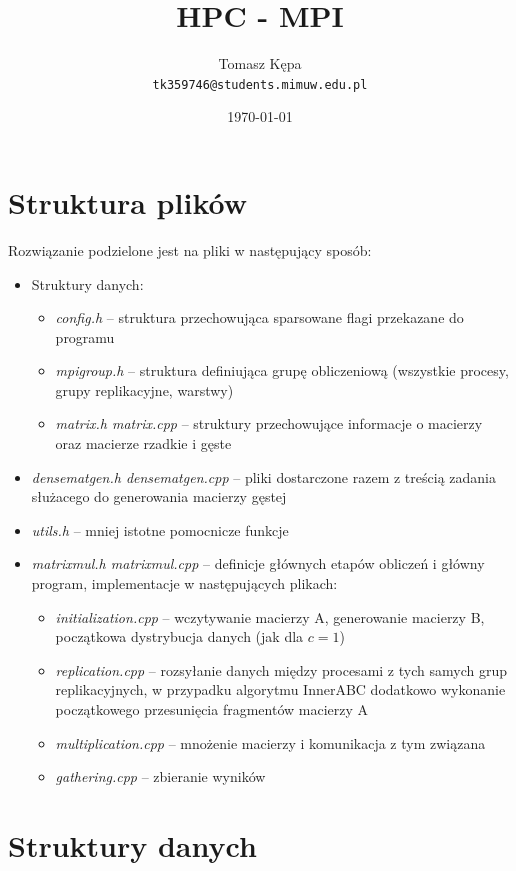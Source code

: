 \documentclass{article}
\date\today
\title{HPC - MPI}
\author{Tomasz Kępa \\ \texttt{tk359746@students.mimuw.edu.pl}}
\begin{document}
\maketitle


\section{Struktura plików}
Rozwiązanie podzielone jest na pliki w następujący sposób:
\begin{itemize}
  \item Struktury danych:
    \begin{itemize}
       \item \emph{config.h} -- struktura przechowująca sparsowane flagi przekazane do programu
       \item \emph{mpigroup.h} -- struktura definiująca grupę obliczeniową (wszystkie procesy, grupy replikacyjne, warstwy)
       \item \emph{matrix.h matrix.cpp} -- struktury przechowujące informacje o macierzy oraz macierze rzadkie i gęste
    \end{itemize}
  \item \emph{densematgen.h densematgen.cpp} -- pliki dostarczone razem z treścią zadania służacego do generowania macierzy gęstej
  \item \emph{utils.h} -- mniej istotne pomocnicze funkcje
  \item \emph{matrixmul.h matrixmul.cpp} -- definicje głównych etapów obliczeń i główny program, implementacje w następujących plikach:
    \begin{itemize}
      \item \emph{initialization.cpp} -- wczytywanie macierzy A, generowanie macierzy B, początkowa dystrybucja danych (jak dla $c=1$)
      \item \emph{replication.cpp} -- rozsyłanie danych między procesami z tych samych grup replikacyjnych, w przypadku algorytmu InnerABC
                                                         dodatkowo wykonanie początkowego przesunięcia fragmentów macierzy A
      \item \emph{multiplication.cpp} -- mnożenie macierzy i komunikacja z tym związana
      \item \emph{gathering.cpp} -- zbieranie wyników
    \end{itemize}
\end{itemize}

\section{Struktury danych}
\end{document}
